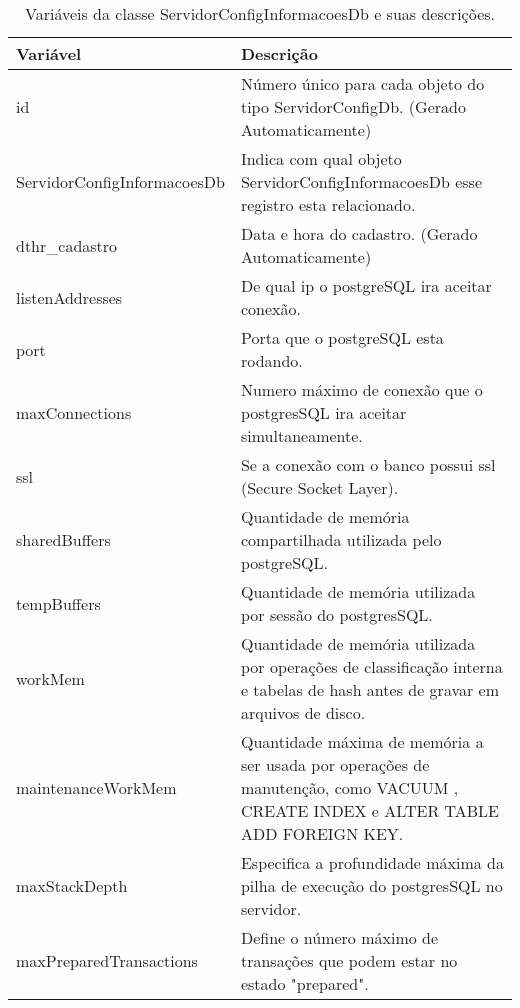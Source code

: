 \begin{table}[!ht]
\centering
\begin{tabular}{|l|l|}
\hline
{\color[HTML]{000000} \textbf{Variável}} & {\color[HTML]{000000} \textbf{Descrição}} \\ \hline
id                                       & \multicolumn{1}{p{10.00cm}|}{Número único para cada objeto do tipo ServidorConfigDb. (Gerado Automaticamente)}\\ \hline
ServidorConfigInformacoesDb              & \multicolumn{1}{p{10.00cm}|}{Indica com qual objeto ServidorConfigInformacoesDb esse registro esta relacionado. }\\ \hline
dthr\_cadastro                           & \multicolumn{1}{p{10.00cm}|}{Data e hora do cadastro. (Gerado Automaticamente)  }\\ \hline
listenAddresses                          & \multicolumn{1}{p{10.00cm}|}{De qual ip o postgreSQL ira aceitar conexão.}\\ \hline
port                                     & \multicolumn{1}{p{10.00cm}|}{Porta que o postgreSQL esta rodando.}\\ \hline
maxConnections                           & \multicolumn{1}{p{10.00cm}|}{Numero máximo de conexão que o postgresSQL ira aceitar simultaneamente. }\\ \hline
ssl                                      & \multicolumn{1}{p{10.00cm}|}{Se a conexão com o banco possui ssl (Secure Socket Layer). }\\ \hline
sharedBuffers                            & \multicolumn{1}{p{10.00cm}|}{Quantidade de memória compartilhada utilizada pelo postgreSQL.}\\ \hline
tempBuffers                              & \multicolumn{1}{p{10.00cm}|}{Quantidade de memória utilizada por sessão do postgresSQL.}\\ \hline
workMem                                  & \multicolumn{1}{p{10.00cm}|}{Quantidade de memória utilizada por operações de classificação interna e tabelas de hash antes de gravar em arquivos de disco.  }\\ \hline
maintenanceWorkMem                       & \multicolumn{1}{p{10.00cm}|}{Quantidade máxima de memória a ser usada por operações de manutenção, como VACUUM , CREATE INDEX e ALTER TABLE ADD FOREIGN KEY. }\\ \hline
maxStackDepth                            & \multicolumn{1}{p{10.00cm}|}{Especifica a profundidade máxima da pilha de execução do postgresSQL no servidor.}\\ \hline
maxPreparedTransactions                  & \multicolumn{1}{p{10.00cm}|}{Define o número máximo de transações que podem estar no estado "prepared".} \\ \hline
\end{tabular}
\caption[Variáveis da classe ServidorConfigInformacoesDb e suas descrições.]{Variáveis da classe ServidorConfigInformacoesDb e suas descrições.}
\label{Tab:VariaveisMonitoramentoPostgres}
\end{table}


